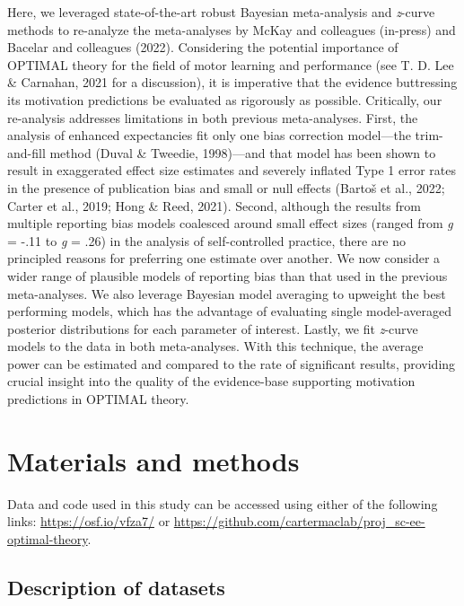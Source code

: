 \documentclass[
  doc, donotrepeattitle,floatsintext]{apa7}
\begin{document}
Here, we leveraged state-of-the-art robust Bayesian meta-analysis and \emph{z}-curve methods to re-analyze the meta-analyses by McKay and colleagues (in-press) and Bacelar and colleagues (2022). Considering the potential importance of OPTIMAL theory for the field of motor learning and performance (see T. D. Lee \& Carnahan, 2021 for a discussion), it is imperative that the evidence buttressing its motivation predictions be evaluated as rigorously as possible. Critically, our re-analysis addresses limitations in both previous meta-analyses. First, the analysis of enhanced expectancies fit only one bias correction model---the trim-and-fill method (Duval \& Tweedie, 1998)---and that model has been shown to result in exaggerated effect size estimates and severely inflated Type 1 error rates in the presence of publication bias and small or null effects (Bartoš et al., 2022; Carter et al., 2019; Hong \& Reed, 2021). Second, although the results from multiple reporting bias models coalesced around small effect sizes (ranged from \emph{g} = -.11 to \emph{g} = .26) in the analysis of self-controlled practice, there are no principled reasons for preferring one estimate over another. We now consider a wider range of plausible models of reporting bias than that used in the previous meta-analyses. We also leverage Bayesian model averaging to upweight the best performing models, which has the advantage of evaluating single model-averaged posterior distributions for each parameter of interest. Lastly, we fit \emph{z}-curve models to the data in both meta-analyses. With this technique, the average power can be estimated and compared to the rate of significant results, providing crucial insight into the quality of the evidence-base supporting motivation predictions in OPTIMAL theory.

\hypertarget{materials-and-methods}{%
\section{Materials and methods}\label{materials-and-methods}}

Data and code used in this study can be accessed using either of the following links: \url{https://osf.io/vfza7/} or \url{https://github.com/cartermaclab/proj_sc-ee-optimal-theory}.

\hypertarget{description-of-datasets}{%
\subsection{Description of datasets}\label{description-of-datasets}}
\end{document}

